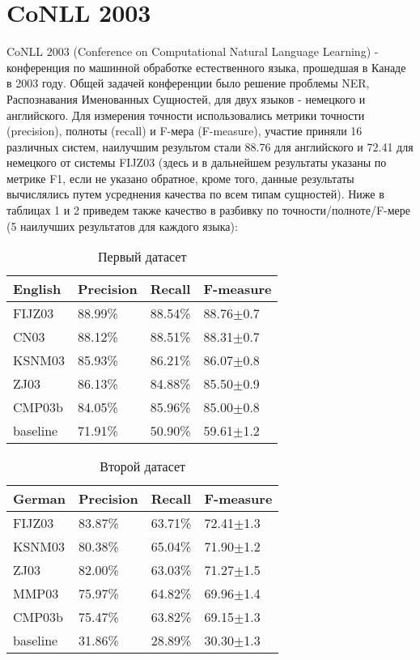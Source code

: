 \section{CoNLL 2003}

CoNLL 2003 (Conference on Computational Natural Language Learning) - конференция по машинной обработке естественного языка, прошедшая в Канаде в 2003 году. Общей задачей конференции было решение проблемы NER, Распознавания Именованных Сущностей, для двух языков - немецкого и английского. Для измерения точности использовались метрики точности (precision), полноты (recall) и F-мера (F-measure), участие приняли 16 различных систем, наилучшим результом стали 88.76 для английского и 72.41 для немецкого от системы FIJZ03 (здесь и в дальнейшем результаты указаны по метрике F1, если не указано обратное, кроме того, данные результаты вычислялись путем усреднения качества по всем типам сущностей). Ниже в таблицах 1 и 2 приведем также качество в разбивку по точности/полноте/F-мере (5 наилучших результатов для каждого языка):

\begin{table}[ht]
\caption{Первый датасет}
\centering
\label{first_dataset}
\begin{tabular}{|l|l|l|l|}
\hline
English      & Precision & Recall  & F-measure \\ \hline
FIJZ03       & 88.99\%   & 88.54\% & 88.76${\pm}$0.7 \\ \hline
CN03         & 88.12\%   & 88.51\% & 88.31${\pm}$0.7 \\ \hline
KSNM03       & 85.93\%   & 86.21\% & 86.07${\pm}$0.8 \\ \hline
ZJ03         & 86.13\%   & 84.88\% & 85.50${\pm}$0.9 \\ \hline
CMP03b       & 84.05\%   & 85.96\% & 85.00${\pm}$0.8 \\ \hline
baseline     & 71.91\%   & 50.90\% & 59.61${\pm}$1.2 \\ \hline
\end{tabular}
\end{table}

\begin{table}[ht]
\caption{Второй датасет}
\centering
\label{second_dataset}
\begin{tabular}{|l|l|l|l|}
\hline
German      & Precision & Recall  & F-measure \\ \hline
FIJZ03      & 83.87\%   & 63.71\% & 72.41${\pm}$1.3 \\ \hline
KSNM03      & 80.38\%   & 65.04\% & 71.90${\pm}$1.2 \\ \hline
ZJ03        & 82.00\%   & 63.03\% & 71.27${\pm}$1.5 \\ \hline
MMP03       & 75.97\%   & 64.82\% & 69.96${\pm}$1.4 \\ \hline
CMP03b      & 75.47\%   & 63.82\% & 69.15${\pm}$1.3 \\ \hline
baseline    & 31.86\%   & 28.89\% & 30.30${\pm}$1.3 \\ \hline
\end{tabular}
\end{table}

